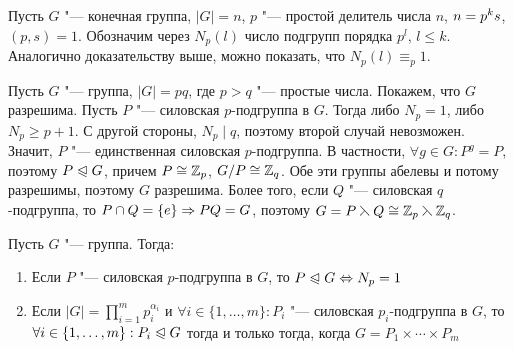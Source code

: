 \begin{note}
	Пусть $G$ "--- конечная группа, $|G| = n$, $p$ "--- простой делитель числа $n$, $n \hm= p^ks$, $(p, s) = 1$. Обозначим через $N_p(l)$ число подгрупп порядка $p^l$, $l \le k$. Аналогично доказательству выше, можно показать, что $N_p(l) \equiv_p 1$.
\end{note}

\begin{example}
	Пусть $G$ "--- группа, $|G| = pq$, где $p > q$ "--- простые числа. Покажем, что $G$ разрешима. Пусть $P$ "--- силовская $p$-подгруппа в $G$. Тогда либо $N_p = 1$, либо $N_p \ge p + 1$. С другой стороны, $N_p\mid q$, поэтому второй случай невозможен. Значит, $P$ "--- единственная силовская $p$-подгруппа. В частности, $\forall g \in G: P^g = P$, поэтому $P \trianglelefteqslant G$, причем $P \cong \mathbb{Z}_p$, $G / P \cong \mathbb{Z}_q$. Обе эти группы абелевы и потому разрешимы, поэтому $G$ разрешима. Более того, если $Q$ "--- силовская $q$-подгруппа, то $P \cap Q = \{e\} \Rightarrow PQ = G$, поэтому $G = P \leftthreetimes Q \cong \mathbb{Z}_p \leftthreetimes \mathbb{Z}_q$.
\end{example}

\begin{theorem} Пусть $G$ "--- группа. Тогда:
	\begin{enumerate}
		\item Если $P$ "--- силовская $p$-подгруппа в $G$, то $P \normal G \hm\Lra N_p = 1$
		\item Если $|G| = \prod_{i = 1}^mp_i^{\alpha_i}$ и $\forall i \in \{1, \dotsc, m\}: P_i$ "--- силовская $p_i$-подгруппа в $G$, то $\forall i \hm\in \{1, \dotsc, m\}: P_i \normal G$ тогда и только тогда, когда $G = P_1 \times \dotsb \times P_m$
	\end{enumerate}
\end{theorem}

